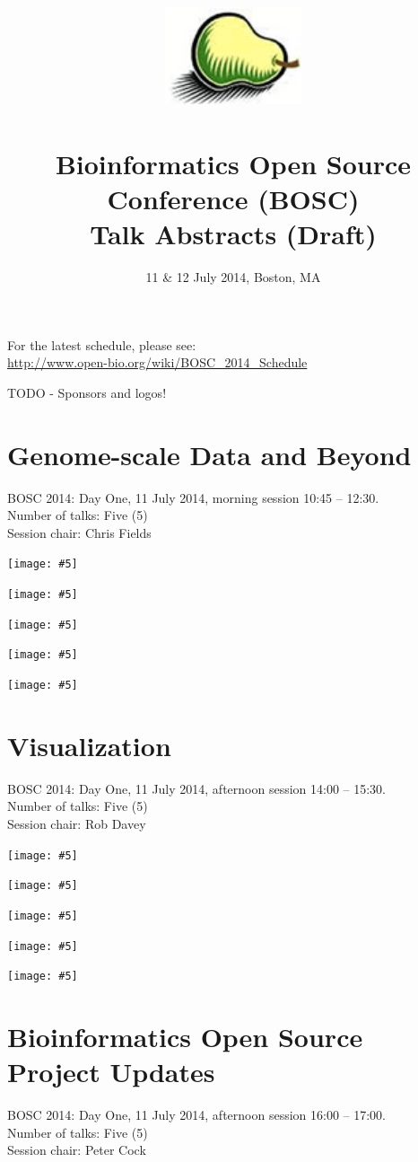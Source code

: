 \documentclass[10pt,oneside]{article}
\title{%
\vspace{4cm}
\includegraphics[width=4cm]{../../logos/100px-Pear.png}\\
~\\Bioinformatics Open Source Conference (BOSC)\\
Talk Abstracts (Draft)}
\date{11 \& 12 July 2014, Boston, MA}
\newcommand{\embed}[5]{\begin{center}\texttt{[image: \#5]}\end{center}}
\begin{document}
\pagestyle{empty}

\maketitle

\noindent For the latest schedule, please see:\\
\url{http://www.open-bio.org/wiki/BOSC_2014_Schedule}

TODO - Sponsors and logos!

\thispagestyle{empty}

\newpage
\section*{Genome-scale Data and Beyond}
BOSC 2014: Day One, 11 July 2014, morning session 10:45 -- 12:30. \\
\noindent Number of talks: Five (5) \\
\noindent Session chair: Chris Fields

\embed{2.5cm}{10cm}{2.5cm}{2.5cm}{GenomeScale-16-ADAM.pdf}
\embed{2.5cm}{10cm}{2.5cm}{2.5cm}{GenomeScale-32-Framework-RNASeq.pdf}
\embed{2.5cm}{5cm}{2cm}{2.5cm}{GenomeScale-27-SPADES.pdf}
\embed{2cm}{2.5cm}{2cm}{2.5cm}{GenomeScale-22-SigSeeker.pdf}
\embed{2cm}{3cm}{2cm}{2.5cm}{GenomeScale-21-Galaxy-extending.pdf}

\newpage
\section*{Visualization}
BOSC 2014: Day One, 11 July 2014, afternoon session 14:00 -- 15:30. \\
\noindent Number of talks: Five (5) \\
\noindent Session chair: Rob Davey

\embed{2.5cm}{2.5cm}{2.5cm}{2.5cm}{Visualization-39-WormGUIDES.pdf}
\embed{3cm}{10cm}{3cm}{2.5cm}{Visualization-05-BioJS.pdf}
\embed{2.5cm}{10cm}{2.5cm}{2cm}{Visualization-07-Biodalliance.pdf}
\embed{1.5cm}{2.5cm}{1.5cm}{2.5cm}{Visualization-17-TGAC-browser.pdf}
\embed{2.5cm}{10cm}{2.5cm}{2.5cm}{Visualization-38-IGB.pdf}

\newpage
\section*{Bioinformatics Open Source Project Updates}
BOSC 2014: Day One, 11 July 2014, afternoon session 16:00 -- 17:00. \\
\noindent Number of talks: Five (5) \\
\noindent Session chair: Peter Cock
\end{document}
